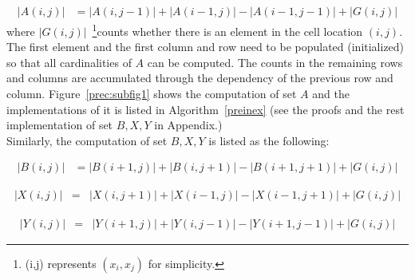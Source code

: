 \documentclass[AMA,LATO1COL]{WileyNJD-v2}
\begin{document}
\begin{eqnarray}
|A(i,j)|  &= |A(i,j-1)| + |A(i-1,j)| - |A(i-1,j-1)|  + |G(i,j)|
\end{eqnarray}
\normalsize
where $|G(i,j)|$~\footnote{(i,j) represents $(x_i,x_j)$ for simplicity.}counts whether there is an element in the cell location $(i,j)$. The first element and the first column and row need to be populated (initialized) so that all cardinalities of $A$ can be computed. The counts in the remaining rows and columns are accumulated through the dependency of the previous row and column. Figure~\ref{prec:subfig1} shows the computation of set $A$ and the implementations of it is listed in Algorithm~\ref{preinex} (see the proofs and the rest implementation of set $B,X,Y$ in Appendix.)\\

Similarly, the computation of set $B,X,Y$ is listed as the following:

\begin{eqnarray}
|B(i,j)|  &= |B(i+1,j)| + |B(i,j+1)| - |B(i+1,j+1)| + |G(i,j)|
\end{eqnarray}
\normalsize

\begin{eqnarray}
|X(i,j)|  &= & |X(i,j+1)| + |X(i-1,j)| - |X(i-1,j+1)| + |G(i,j)|
\end{eqnarray}
\normalsize

\begin{eqnarray}
|Y(i,j)|  &= & |Y(i+1,j)| + |Y(i,j-1)| - |Y(i+1,j-1)| + |G(i,j)|
\end{eqnarray}
\normalsize
\end{document}
